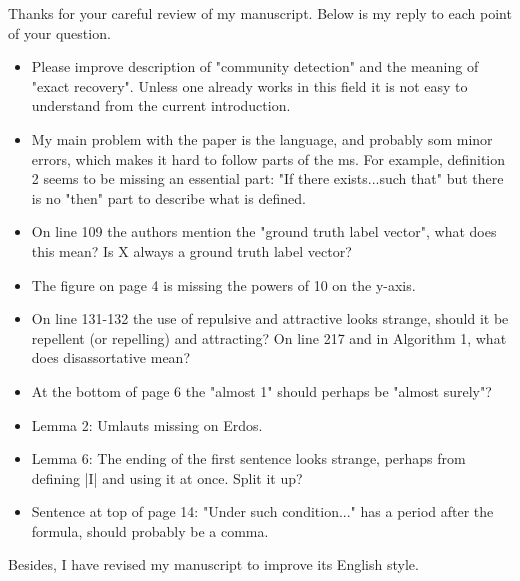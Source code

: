 \documentclass{article}
\begin{document}
	\pagestyle{empty}
	Thanks for your careful review of my manuscript. Below is my reply to each point of your question.
\begin{itemize}
\item Please improve description of "community detection" and the meaning of "exact recovery". Unless one already works in this field it is not easy to understand from the current introduction.

\item My main problem with the paper is the language, and probably som minor errors, which makes it hard to follow parts of the ms. For example, definition 2 seems to be missing an essential part: "If there exists...such that" but there is no "then" part to describe what is defined. 

\item On line 109 the authors mention the "ground truth label vector", what does this mean? Is X always a ground truth label vector? 

\item The figure on page 4 is missing the powers of 10 on the y-axis.

\item On line 131-132 the use of repulsive and attractive looks strange, should it be repellent (or repelling) and attracting? On line 217 and in Algorithm 1, what does disassortative mean?

\item At the bottom of page 6 the "almost 1" should perhaps be "almost surely"?

\item Lemma 2: Umlauts missing on Erdos.

\item Lemma 6: The ending of the first sentence looks strange, perhaps from defining |I| and using it at once. Split it up?

\item Sentence at top of page 14: "Under such condition..." has a period after the formula, should probably be a comma.
\end{itemize}
Besides, I have revised my manuscript to improve its English style.
\end{document}

